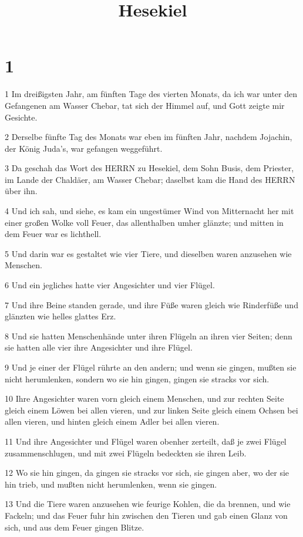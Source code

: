 

\title{Hesekiel}


\chapter{1}

\par 1 Im dreißigsten Jahr, am fünften Tage des vierten Monats, da ich war unter den Gefangenen am Wasser Chebar, tat sich der Himmel auf, und Gott zeigte mir Gesichte.
\par 2 Derselbe fünfte Tag des Monats war eben im fünften Jahr, nachdem Jojachin, der König Juda's, war gefangen weggeführt.
\par 3 Da geschah das Wort des HERRN zu Hesekiel, dem Sohn Busis, dem Priester, im Lande der Chaldäer, am Wasser Chebar; daselbst kam die Hand des HERRN über ihn.
\par 4 Und ich sah, und siehe, es kam ein ungestümer Wind von Mitternacht her mit einer großen Wolke voll Feuer, das allenthalben umher glänzte; und mitten in dem Feuer war es lichthell.
\par 5 Und darin war es gestaltet wie vier Tiere, und dieselben waren anzusehen wie Menschen.
\par 6 Und ein jegliches hatte vier Angesichter und vier Flügel.
\par 7 Und ihre Beine standen gerade, und ihre Füße waren gleich wie Rinderfüße und glänzten wie helles glattes Erz.
\par 8 Und sie hatten Menschenhände unter ihren Flügeln an ihren vier Seiten; denn sie hatten alle vier ihre Angesichter und ihre Flügel.
\par 9 Und je einer der Flügel rührte an den andern; und wenn sie gingen, mußten sie nicht herumlenken, sondern wo sie hin gingen, gingen sie stracks vor sich.
\par 10 Ihre Angesichter waren vorn gleich einem Menschen, und zur rechten Seite gleich einem Löwen bei allen vieren, und zur linken Seite gleich einem Ochsen bei allen vieren, und hinten gleich einem Adler bei allen vieren.
\par 11 Und ihre Angesichter und Flügel waren obenher zerteilt, daß je zwei Flügel zusammenschlugen, und mit zwei Flügeln bedeckten sie ihren Leib.
\par 12 Wo sie hin gingen, da gingen sie stracks vor sich, sie gingen aber, wo der sie hin trieb, und mußten nicht herumlenken, wenn sie gingen.
\par 13 Und die Tiere waren anzusehen wie feurige Kohlen, die da brennen, und wie Fackeln; und das Feuer fuhr hin zwischen den Tieren und gab einen Glanz von sich, und aus dem Feuer gingen Blitze.
